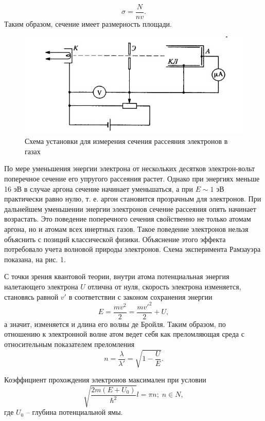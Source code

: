 \documentclass[a4paper, 12pt]{article}
\begin{document}
\begin{equation}\label{eq:sigma}
	\sigma = \frac{N}{n v}.
\end{equation}
Таким образом, сечение имеет размерность площади.
\begin{figure}[H]
	\centering
	\includegraphics[width=0.5\linewidth]{fig_1.jpg}
	\caption{Схема установки для измерения сечения рассеяния электронов в газах}
	\label{fig:screenshot2}
\end{figure}
По мере уменьшения энергии электрона от нескольких десятков электрон-вольт поперечное сечение его упругого рассеяния растет. 
Однако при энергиях меньше 16 эВ в случае аргона сечение начинает уменьшаться, а при $ E \sim 1 $ эВ практически равно нулю, т. е. аргон становится прозрачным для электронов. 
При дальнейшем уменьшении энергии электронов сечение рассеяния опять начинает возрастать. Это поведение поперечного сечения свойственно не только атомам аргона, но и атомам всех инертных газов. 
Такое поведение электронов нельзя объяснить с позиций классической физики. Объяснение этого эффекта потребовало учета волновой природы электронов. Схема эксперимента Рамзауэра показана, на рис. 1.


С точки зрения квантовой теории, внутри атома потенциальная энергия налетающего электрона $ U $ отлична от нуля, скорость электрона изменяется, становясь равной $ v' $ в соответствии с законом сохранения энергии
\begin{equation*}
	E = \frac{m v^2}{2} = \frac{m v'^2}{2}+ U,
\end{equation*}
а значит, изменяется и длина его волны де Бройля. Таким образом, по отношению к электронной волне атом ведет себя как преломляющая среда с относительным показателем преломления
\begin{equation*}
	n = \frac{\lambda}{\lambda'} = \sqrt{1-\frac{U}{E}}.
\end{equation*}

Коэффициент прохождения электронов максимален при условии
\begin{equation}\label{eq:at}
	\sqrt{\frac{2 m (E+U_0)}{\hbar^2}}l = \pi n;\; n \in N,
\end{equation}
где $ U_0 $ -- глубина потенциальной ямы.
\end{document}
